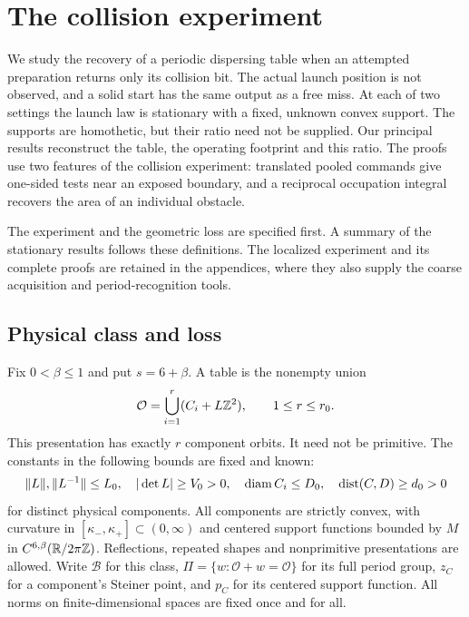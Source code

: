 \section{The collision experiment}
\label{sec:setting}
We study the recovery of a periodic dispersing table when an attempted
preparation returns only its collision bit. The actual launch position
is not observed, and a solid start has the same output as a free miss.
At each of two settings the launch law is stationary with a fixed,
unknown convex support. The supports are homothetic, but their ratio
need not be supplied. Our principal results reconstruct the table, the
operating footprint and this ratio. The proofs use two features of the
collision experiment: translated pooled commands give one-sided tests
near an exposed boundary, and a reciprocal occupation integral recovers
the area of an individual obstacle.

The experiment and the geometric loss are specified first. A summary
of the stationary results follows these definitions. The localized
experiment and its complete proofs are retained in the appendices, where
they also supply the coarse acquisition and period-recognition tools.

\subsection{Physical class and loss}
Fix $0<\beta\le1$ and put $s=6+\beta$. A table is the nonempty union
\begin{equation}\label{eq:presentation}
 \mathcal O=\bigcup_{i=1}^r(C_i+L\mathbb Z^2),\qquad 1\le r\le r_0.
\end{equation}
This presentation has exactly $r$ component orbits. It need not be
primitive. The constants in the following bounds are fixed and known:
\begin{equation}\label{eq:priors}
 \|L\|,\|L^{-1}\|\le L_0,\quad |\det L|\ge V_0>0,\quad
 \operatorname{diam} C_i\le D_0,\quad \operatorname{dist}(C,D)\ge d_0>0
\end{equation}
for distinct physical components. All components are strictly convex,
with curvature in $[\kappa_-,\kappa_+]\subset(0,\infty)$ and centered
support functions bounded by $M$ in $C^{6,\beta}(\mathbb R/2\pi\mathbb Z)$.
Reflections, repeated shapes and nonprimitive presentations are allowed.
Write $\mathcal B$ for this class, $\Pi=\{w:\mathcal O+w=\mathcal O\}$
for its full period group, $z_C$ for a component's Steiner point, and
$p_C$ for its centered support function. All norms on finite-dimensional
spaces are fixed once and for all.

